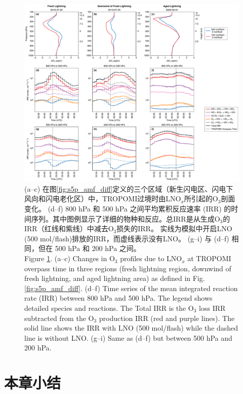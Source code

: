 \begin{figure}[h]
    \includegraphics[width=16cm]{./figures/irr_timeseries.pdf}
    \caption{
    (a--c) 在图\ref{fig:s5p_amf_diff}定义的三个区域（新生闪电区、闪电下风向和闪电老化区）中，TROPOMI过境时由LNO$_x$所引起的O$_3$剖面变化。
    (d--f) 800 hPa 和 500 hPa 之间平均累积反应速率 (IRR) 的时间序列。其中图例显示了详细的物种和反应。总IRR是从生成O$_3$的IRR（红线和紫线）中减去O$_3$损失的IRR。
     实线为模拟中开启LNO (500 mol/flash)排放的IRR，而虚线表示没有LNO。
    (g--i) 与 (d--f) 相同，但在 500 hPa 和 200 hPa 之间。\\
    Figure \ref{fig:irr_timeseries}. (a--c) Changes in O$_3$ profiles due to LNO$_x$ at TROPOMI overpass time in three regions (fresh lightning region, downwind of fresh lightning, and aged lightning area) as defined in Fig. \ref{fig:s5p_amf_diff}.
    (d--f) Time series of the mean integrated reaction rate (IRR) between 800 hPa and 500 hPa.
    The legend shows detailed species and reactions.
    The Total IRR is the O$_3$ loss IRR subtracted from the O$_3$ production IRR (red and purple lines).
    The solid line shows the IRR with LNO (500 mol/flash) while the dashed line is without LNO.
    (g--i) Same as (d--f) but between 500 hPa and 200 hPa.
    }
    \label{fig:irr_timeseries}
\end{figure}

\section{本章小结}
